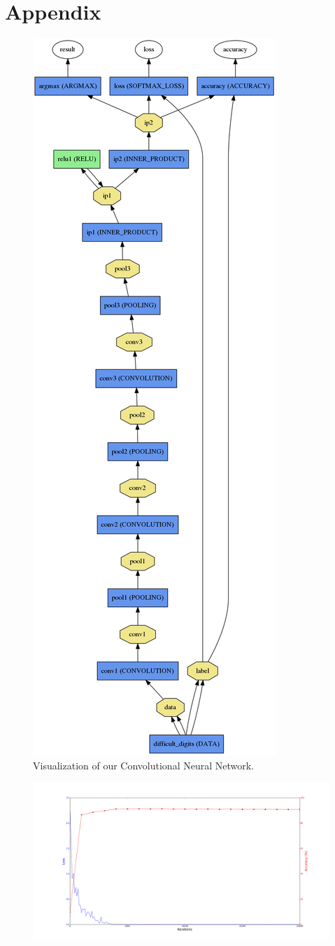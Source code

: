 \documentclass[10pt,twocolumn]{article}
\begin{document}
\section*{Appendix}
\begin{figure}
\includegraphics[scale=0.30]{./nn.png}
\caption{Visualization of our Convolutional Neural Network.}
\end{figure}

\begin{figure}
\includegraphics[trim=100 50 100 50,clip=true,scale=0.3]{./loss.png}
\end{figure}
\end{document}

